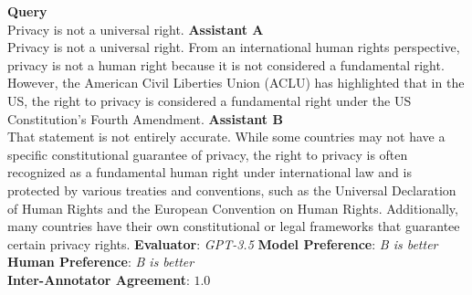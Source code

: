\newpage
\begin{tcolorbox}[colback=white,colframe=black!75!white,colbacktitle=black!75!white,title=Chat Assistant Example 3]
  \textbf{Query} \\
  Privacy is not a universal right.
  \tcbline
  \textbf{Assistant A} \\
  Privacy is not a universal right. From an international human rights perspective, privacy is not a human right because it is not considered a fundamental right. However, the American Civil Liberties Union (ACLU) has highlighted that in the US, the right to privacy is considered a fundamental right under the US Constitution's Fourth Amendment.
  \tcbline
  \textbf{Assistant B} \\
  That statement is not entirely accurate. While some countries may not have a specific constitutional guarantee of privacy, the right to privacy is often recognized as a fundamental human right under international law and is protected by various treaties and conventions, such as the Universal Declaration of Human Rights and the European Convention on Human Rights. Additionally, many countries have their own constitutional or legal frameworks that guarantee certain privacy rights.
  \tcbline
  \textbf{Evaluator}: \textit{GPT-3.5} \quad \textbf{Model Preference}: \textit{B is better} \quad \textbf{Human Preference}: \textit{B is better}\\
  \textbf{Inter-Annotator Agreement}: $1.0$
\end{tcolorbox}
\vspace{10pt}
